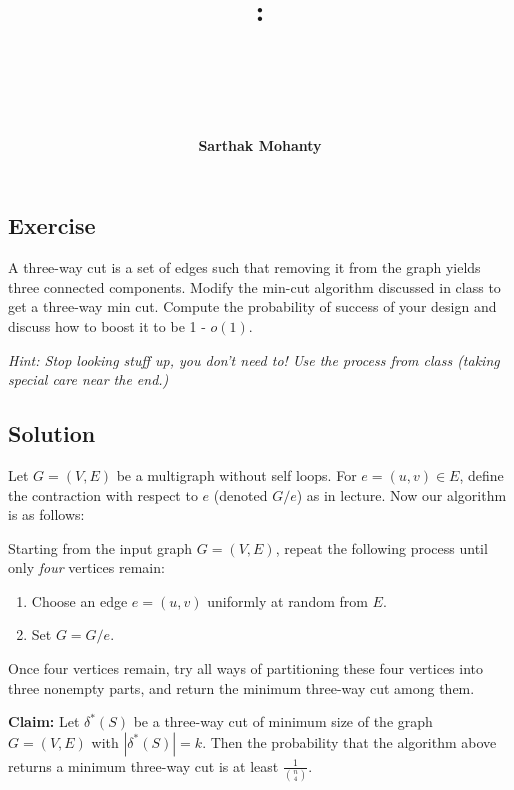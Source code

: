 \documentclass[14pt]{extreport}
\title{
    \vspace{1.75in}
    \textbf{\lectClass:\\ \lectTitle}\\
    \vspace{0.1in}\large{\textit{\lectClassInstructor\ \lectSection}}
    \vspace{2in}
    \author{\textbf{Sarthak Mohanty}}
    \date{}
}
\newcounter{counter}
\newcommand{\Exercise}{Exercise \stepcounter{counter}\thecounter}
\begin{document}
\maketitle
\pagebreak

\subsection*{\Exercise}
    A three-way cut is a set of edges such that removing it from the graph yields three connected components. Modify the min-cut algorithm discussed in class to get a three-way min cut. Compute the probability of success of your design and discuss how to boost it to be 1 - $o(1)$.

    \vspace{2mm}
    \textit{Hint: Stop looking stuff up, you don't need to! Use the process from class (taking special care near the end.)}


\subsection*{Solution}
    Let $G = (V, E)$ be a multigraph without self loops. For $e = (u, v) \in E$, define the contraction with respect to $e$ (denoted $G / e$) as in lecture. Now our algorithm is as follows:

    \vspace{2mm}
    Starting from the input graph $G = (V, E)$, repeat the following process until only \textit{four} vertices remain:
    \begin{enumerate}[label = \arabic*.]
        \item Choose an edge $e = (u, v)$ uniformly at random from $E$.
        \item Set $G = G / e$.
    \end{enumerate}
    Once four vertices remain, try all ways of partitioning these four vertices into three nonempty parts, and return the minimum three-way cut among them.

    \vspace{2mm}
    \textbf{Claim: } Let $\delta^{*}(S)$ be a three-way cut of minimum size of the graph $G = (V, E)$ with $|\delta^{*}(S)| = k$. Then the probability that the algorithm above returns a minimum three-way cut is at least $\frac{1}{\binom{n}{4}}$.
\end{document}
